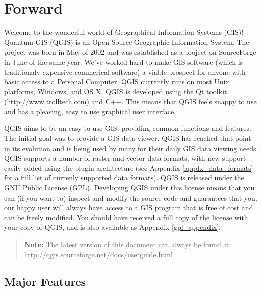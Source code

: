 
\section{Forward}\label{label_forward}
\setcounter{page}{1}

Welcome to the wonderful world of Geographical Information Systems (GIS)!
Quantum GIS (QGIS) is an Open Source Geographic Information System. The project
was born in May of 2002 and was established as a project on SourceForge in June
of the same year. We've worked hard to make GIS software (which is traditionaly
expensive commerical software) a viable prospect for anyone with basic access
to a Personal Computer. QGIS currently runs on most Unix platforms, Windows, and
OS X. QGIS is developed using the Qt toolkit (\url{http://www.trolltech.com})
and C++. This means that QGIS feels snappy to use and has a pleasing, easy to
use graphical user interface. 

QGIS aims to be an easy to use GIS, providing common functions and features.
The initial goal was to provide a GIS data viewer. QGIS has reached that point
in its evolution and is being used by many for their daily GIS data viewing
needs. QGIS supports a number of raster and vector data formats, with new
support easily added using the plugin architecture (see Appendix
\ref{appdx_data_formats} for a full list of currenly supported data formats).
QGIS is released under the GNU Public License (GPL). Developing QGIS under this
license means that you can (if you want to) inspect and modify the source code
and guarantees that you, our happy user will always have access to a GIS
program that is free of cost and can be freely modified. You should have
received a full copy of the license with your copy of QGIS, and is also
available as Appendix \ref{gpl_appendix}.  

\begin{quote}
\begin{center}
\textbf{Note:} The latest version of this document can always be found at \newline
http://qgis.sourceforge.net/docs/userguide.html 
\end{center}
\end{quote}

\subsection{Major Features}\label{label_majfeat}

